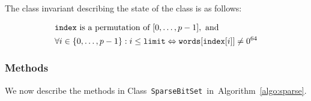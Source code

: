 \documentclass[a4paper,11pt]{article}
\newcommand{\Algoref}[1]{Algorithm~\ref{#1}}
\newcommand{\Words}{\texttt{words}}
\newcommand{\Index}{\texttt{index}}
\newcommand{\Limit}{\texttt{limit}}
\newcommand{\SparseBitSet}{\texttt{SparseBitSet}}
\numberwithin{equation}{section}
\begin{document}
\noindent
The class invariant describing the state of the class is as follows:

\begin{alignat}{1}
  \label{eq:invariant}
  &\Index~\text{is a permutation of~} [0,\dots,p-1],\text{~and} \\
  &\forall i \in \Set{0,\dots,p-1}: i \leq \Limit \Leftrightarrow \Words[\Index[i]] \neq 0^{64}
\end{alignat}


\subsubsection{Methods}
We now describe the methods in Class~\SparseBitSet~in~\Algoref{algo:sparse}.
\end{document}
